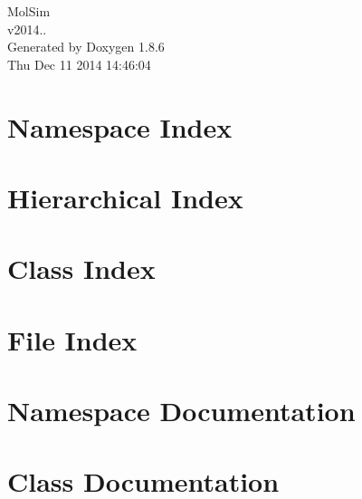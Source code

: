 \documentclass[twoside]{book}
\newcommand{\clearemptydoublepage}{%
  \newpage{\pagestyle{empty}\cleardoublepage}%
}
\begin{document}
\hypersetup{pageanchor=false}
\begin{titlepage}
\vspace*{7cm}
\begin{center}%
{\Large Mol\-Sim \\[1ex]\large v2014.. }\\
\vspace*{1cm}
{\large Generated by Doxygen 1.8.6}\\
\vspace*{0.5cm}
{\small Thu Dec 11 2014 14:46:04}\\
\end{center}
\end{titlepage}
\clearemptydoublepage
\tableofcontents
\clearemptydoublepage
{}
\hypersetup{pageanchor=true}

\chapter{Namespace Index}

\chapter{Hierarchical Index}

\chapter{Class Index}

\chapter{File Index}

\chapter{Namespace Documentation}


\chapter{Class Documentation}




















\end{document}
